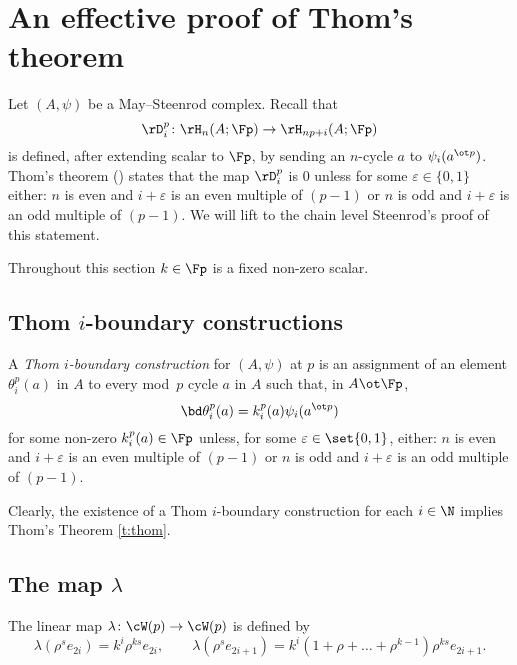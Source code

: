 
\appendix
\section{An effective proof of Thom's theorem}\label{s:thom}


Let $(A,\psi)$ be a May--Steenrod complex.
Recall that
\[
\rD_i^p \colon \rH_n(A; \Fp) \to \rH_{np+i}(A; \Fp)
\]
is defined, after extending scalar to $\Fp$, by sending an $n$-cycle $a$ to $\psi_i(a^{\ot p})$.
Thom's theorem (\cite[218]{steenrod1953cyclic}) states that the map $\rD_i^p$ is $0$ unless for some $\varepsilon \in \{0,1\}$ either: $n$ is even and $i+\varepsilon$ is an even multiple of $(p-1)$ or $n$ is odd and $i+\varepsilon$ is an odd multiple of $(p-1)$.
We will lift to the chain level Steenrod's proof of this statement.

Throughout this section $k \in \Fp$ is a fixed non-zero scalar.

\subsection{Thom $i$-boundary constructions}

\begin{definition}
	A \textit{Thom $i$-boundary construction} for $(A,\psi)$ at $p$ is an assignment of an element $\theta_i^p(a)$ in $A$ to every mod~$p$ cycle $a$ in $A$ such that, in $A \ot \Fp$,
	\[
	\bd \theta_i^p(a) = k_i^p(a) \psi_i(a^{\ot p})
	\]
	for some non-zero $k^p_i(a) \in \Fp$ unless, for some $\varepsilon \in \set{0,1}$, either: $n$ is even and $i+\varepsilon$ is an even multiple of $(p-1)$ or $n$ is odd and $i+\varepsilon$ is an odd multiple of $(p-1)$.
\end{definition}

Clearly, the existence of a Thom $i$-boundary construction for each $i \in \N$ implies Thom's Theorem \cref{t:thom}.

\subsection{The map $\lambda$}

\begin{definition}
	The linear map $\lambda \colon \cW(p) \to \cW(p)$ is defined by
	\[
	\lambda(\rho^s e_{2i}) = k^i \rho^{ks} e_{2i}, \qquad
	\lambda(\rho^s e_{2i+1}) = k^i (1+\rho+\dots+\rho^{k-1}) \rho^{ks} e_{2i+1}.
	\]
\end{definition}

